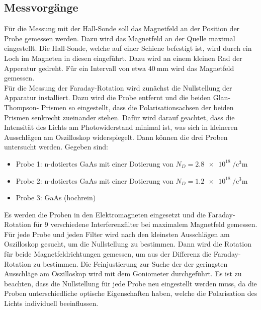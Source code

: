 \subsection{Messvorgänge}
Für die Messung mit der Hall-Sonde soll das Magnetfeld an der Position der Probe 
gemessen werden. Dazu wird das Magnetfeld an der Quelle maximal eingestellt. Die 
Hall-Sonde, welche auf einer Schiene befestigt ist, wird durch ein Loch im Magneten
in diesen eingeführt. Dazu wird an einem kleinen Rad der Apperatur gedreht. Für ein 
Intervall von etwa $\qty{40}{\milli\meter}$ wird das Magnetfeld gemessen.
\vspace{0.5cm}
\\
\noindent Für die Messung der Faraday-Rotation wird zunächst die Nullstellung der
Apparatur installiert. Dazu wird die Probe entfernt und die beiden Glan-Thompson-
Prismen so eingestellt, dass die Polarisationsachsen der beiden Prismen senkrecht 
zueinander stehen. Dafür wird darauf geachtet, dass die Intensität des Lichts am
Photowiderstand minimal ist, was sich in kleineren Ausschlägen am Oszilloskop 
widerspiegelt. Dann können die drei Proben untersucht werden. Gegeben sind:
\begin{itemize}
    \item Probe 1: n-dotiertes GaAs mit einer Dotierung von \(N_D = \qty{2.8e18}{\per\cubic\centi\meter}\)
    \item Probe 2: n-dotiertes GaAs mit einer Dotierung von \(N_D = \qty{1.2e18}{\per\cubic\centi\meter}\)
    \item Probe 3: GaAs (hochrein)
\end{itemize}
Es werden die Proben in den Elektromagneten eingesetzt und die Faraday-Rotation
für 9 verschiedene Interferenzfilter bei maximalem Magnetfeld gemessen. Für jede 
Probe und jeden Filter wird nach den kleinsten Ausschlägen am Oszilloskop gesucht,
um die Nullstellung zu bestimmen. Dann wird die Rotation für beide Magnetfeldrichtungen
gemessen, um aus der Differenz die Faraday-Rotation zu bestimmen. Die Feinjustierung 
zur Suche der der geringsten Ausschläge am Oszilloskop wird mit dem Goniometer 
durchgeführt. Es ist zu beachten, dass die Nullstellung für jede Probe neu eingestellt
werden muss, da die Proben unterschiedliche optische Eigenschaften haben, welche die 
Polarisation des Lichts individuell beeinflussen.